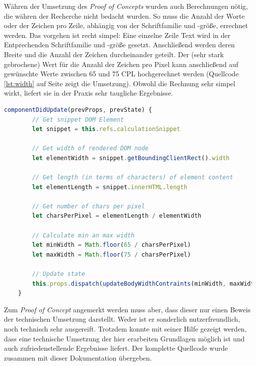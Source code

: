 Währen der Umsetzung des \textit{Proof of Concepts} wurden auch Berechnungen nötig, die währen der Recherche nicht bedacht wurden. So muss die Anzahl der Worte oder der Zeichen pro Zeile, abhängig von der Schriftfamilie und -größe, errechnet werden. Das vorgehen ist recht simpel: Eine einzelne Zeile Text wird in der Entprechenden Schriftfamilie und -größe gesetzt. Anschließend werden deren Breite und die Anzahl der Zeichen durcheinander geteilt. Der (sehr stark gebrochene) Wert für die Anzahl der Zeichen pro Pixel kann anschließend auf gewünschte Werte zwischen 65 und 75 CPL hochgerechnet werden (Quellcode \ref{lst:width} auf Seite \pageref{lst:width} zeigt die Umsetzung). Obwohl die Rechnung sehr simpel wirkt, liefert sie in der Praxis sehr taugliche Ergebnisse.

\begin{lstlisting}[caption={Berechnung der Mindest- und Maximalweite des Fließtextes},label={lst:width},language=javascript]
	componentDidUpdate(prevProps, prevState) {
	    // Get snippet DOM Element
	    let snippet = this.refs.calculationSnippet
	
	    // Get width of rendered DOM node
	    let elementWidth = snippet.getBoundingClientRect().width
	
	    // Get length (in terms of characters) of element content
	    let elementLength = snippet.innerHTML.length
	
	    // Get number of chars per pixel
	    let charsPerPixel = elementLength / elementWidth
	
	    // Calculate min an max width
	    let minWidth = Math.floor(65 / charsPerPixel)
	    let maxWidth = Math.floor(75 / charsPerPixel)
	
	    // Update state
	    this.props.dispatch(updateBodyWidthContraints(minWidth, maxWidth))
  	}
\end{lstlisting}

Zum \textit{Proof of Concept} angemerkt werden muss aber, dass dieser nur einen Beweis der technischen Umsetzung darstellt. Weder ist er sonderlich nutzerfreundlich, noch technisch sehr ausgereift. Trotzdem konnte mit seiner Hilfe gezeigt werden, dass eine technische Umsetzung der hier erarbeiten Grundlagen möglich ist und auch zufriedenstellende Ergebnisse liefert. Der komplette Quellcode wurde zusammen mit dieser Dokumentation übergeben.

\clearpage
